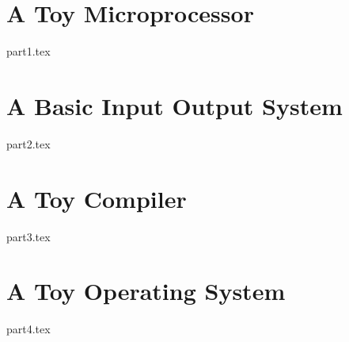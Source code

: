 \documentclass[twoside,10pt]{book}
\begin{document}
\renewcommand\thepart{}
\frontmatter



\mainmatter
\renewcommand\thepart{\arabic{part}}

\part{A Toy Microprocessor}\label{part:processor}

{part1.tex}

\part{A Basic Input Output System}\label{part:computer}

{part2.tex}

\part{A Toy Compiler}\label{part:compiler}

{part3.tex}

\part{A Toy Operating System}\label{part:operating-system}

{part4.tex}

\renewcommand\thepart{}

\nocite{*}

\renewcommand{\bibname}{References}




\backmatter

\end{document}
